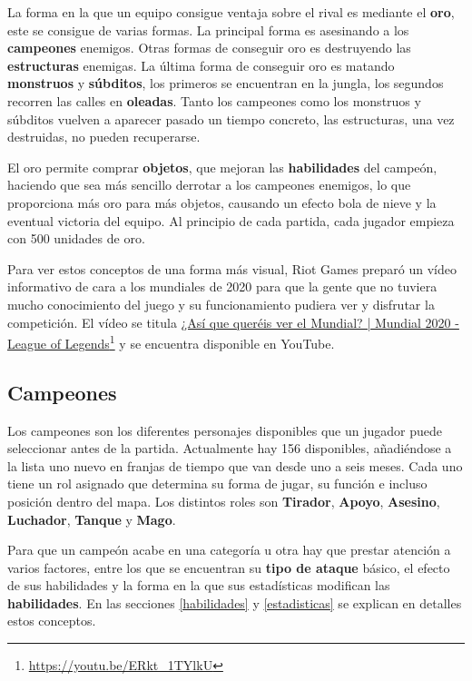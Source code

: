 La forma en la que un equipo consigue ventaja sobre el rival es mediante el \textbf{oro}, este se consigue de varias formas. La principal forma es asesinando a los \textbf{campeones} enemigos. Otras formas de conseguir oro es destruyendo las \textbf{estructuras} enemigas. La última forma de conseguir oro es matando \textbf{monstruos} y \textbf{súbditos}, los primeros se encuentran en la jungla, los segundos recorren las calles en \textbf{oleadas}. Tanto los campeones como los monstruos y súbditos vuelven a aparecer pasado un tiempo concreto, las estructuras, una vez destruidas, no pueden recuperarse.

El oro permite comprar \textbf{objetos}, que mejoran las \textbf{habilidades} del campeón, haciendo que sea más sencillo derrotar a los campeones enemigos, lo que proporciona más oro para más objetos, causando un efecto bola de nieve y la eventual victoria del equipo. Al principio de cada partida, cada jugador empieza con 500 unidades de oro.

Para ver estos conceptos de una forma más visual, Riot Games preparó un vídeo informativo de cara a los mundiales de 2020 para que la gente que no tuviera mucho conocimiento del juego y su funcionamiento pudiera ver y disfrutar la competición. El vídeo se titula \href{https://www.youtube.com/watch?v=ERkt_1TYlkU}{¿Así que queréis ver el Mundial? | Mundial 2020 - League of Legends}\footnote{\url{https://youtu.be/ERkt_1TYlkU}} y se encuentra disponible en YouTube.


\subsection{Campeones}
Los campeones son los diferentes personajes disponibles que un jugador puede seleccionar antes de la partida. Actualmente hay 156 disponibles, añadiéndose a la lista uno nuevo en franjas de tiempo que van desde uno a seis meses. Cada uno tiene un rol asignado que determina su forma de jugar, su función e incluso posición dentro del mapa. Los distintos roles son \textbf{Tirador}, \textbf{Apoyo}, \textbf{Asesino}, \textbf{Luchador}, \textbf{Tanque} y \textbf{Mago}.

Para que un campeón acabe en una categoría u otra hay que prestar atención a varios factores, entre los que se encuentran su \textbf{tipo de ataque} básico, el efecto de sus habilidades y la forma en la que sus estadísticas modifican las \textbf{habilidades}. En las secciones \ref{habilidades} y \ref{estadisticas} se explican en detalles estos conceptos.

